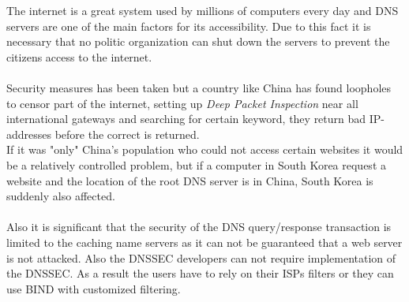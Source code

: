 \documentclass[Preamble]{subfiles}
\begin{document}
The internet is a great system used by millions of computers every day and DNS servers are one of the main factors for its accessibility. 
Due to this fact it is necessary that no politic organization can shut down the servers to prevent the citizens access to the internet.
\\
\\
Security measures has been taken but a country like China has found loopholes to censor part of the internet, setting up \textit{Deep Packet Inspection} near all international gateways and searching for certain keyword, they  return bad IP-addresses before the correct is returned\cite{GFW}.\\
If it was "only" China's population who could not access certain websites it would be a relatively controlled problem, but if a computer in South Korea request a website and the location of the root DNS server is in China, South Korea is suddenly also affected.
\\
\\
Also it is significant that the security of the DNS query/response transaction is limited to the caching name servers as it can not be guaranteed that a web server is not attacked. Also the DNSSEC developers can not require implementation of the DNSSEC. As a result the users have to rely on their ISPs filters or they can use BIND with customized filtering.
\end{document}
